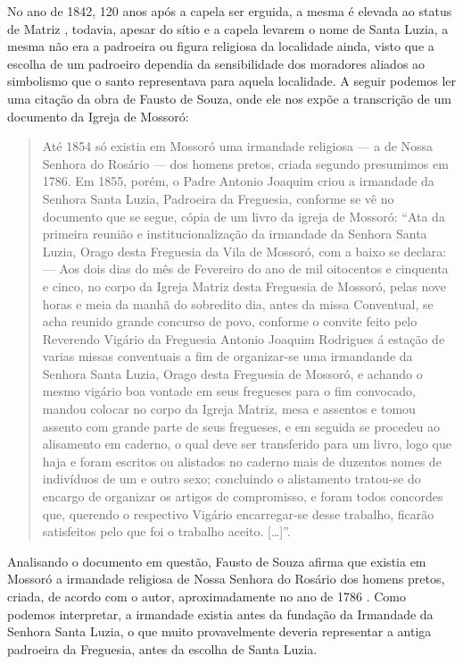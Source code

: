 \begin{refsection}
    No ano de 1842, 120 anos após a capela ser erguida, a mesma é elevada ao status de Matriz \cite[p.~57]{Souza2010Historia}, todavia, apesar do sítio e a capela levarem o nome de Santa Luzia, a mesma não era a padroeira ou figura religiosa da localidade ainda, visto que a escolha de um padroeiro dependia da sensibilidade dos moradores aliados ao simbolismo que o santo representava para aquela localidade. A seguir podemos ler uma citação da obra de Fausto de Souza, onde ele nos expõe a transcrição de um documento da Igreja de Mossoró:

    \begin{quotation}
        Até 1854 só existia em Mossoró uma irmandade religiosa --- a de Nossa Senhora do Rosário --- dos homens pretos, criada segundo presumimos em 1786. Em 1855, porém, o Padre Antonio Joaquim criou a irmandade da Senhora Santa Luzia, Padroeira da Freguesia, conforme se vê no documento que se segue, cópia de um livro da igreja de Mossoró: ``Ata da primeira reunião e institucionalização da irmandade da Senhora Santa Luzia, Orago desta Freguesia da Vila de Mossoró, com a baixo se declara: --- Aos dois dias do mês de Fevereiro do ano de mil oitocentos e cinquenta e cinco, no corpo da Igreja Matriz desta Freguesia de Mossoró, pelas nove horas e meia da manhã do sobredito dia, antes da missa Conventual, se acha reunido grande concurso de povo, conforme o convite feito pelo Reverendo Vigário da Freguesia Antonio Joaquim Rodrigues á estação de varias missas conventuais a fim de organizar-se uma irmandande da Senhora Santa Luzia, Orago desta Freguesia de Mossoró, e achando o mesmo vigário boa vontade em seus fregueses para o fim convocado, mandou colocar no corpo da Igreja Matriz, mesa e assentos e tomou assento com grande parte de seus fregueses, e em seguida se procedeu ao alisamento em caderno, o qual deve ser  transferido para um livro, logo que haja e foram escritos  ou alistados no caderno mais de duzentos nomes de indivíduos de um e outro sexo; concluindo o alistamento tratou-se do encargo de organizar os artigos de compromisso, e foram todos concordes que, querendo o respectivo Vigário encarregar-se desse trabalho, ficarão satisfeitos pelo que foi o trabalho aceito. [\dots]''\:\cite[p.~147--148]{Souza2010Historia}.
    \end{quotation}

    Analisando o documento em questão, Fausto de Souza afirma que existia em Mossoró a irmandade religiosa de Nossa Senhora do Rosário dos homens pretos, criada, de acordo com o autor, aproximadamente no ano de 1786 \cite[p.~147]{Souza2010Historia}. Como podemos interpretar, a irmandade existia antes da fundação da Irmandade da Senhora Santa Luzia, o que muito provavelmente deveria representar a antiga padroeira da Freguesia, antes da escolha de Santa Luzia.  


\end{refsection}
